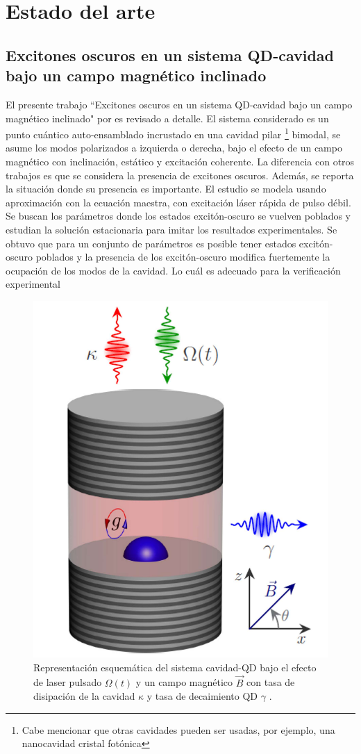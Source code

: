 \documentclass[main.tex]{subfiles}
\begin{document}
\chapter{Estado del arte}
\section[Excitones oscuros en un sistema QD-cavidad bajo un campo magnético...]{Excitones oscuros en un sistema QD-cavidad bajo un campo magnético inclinado}
El presente trabajo ``Excitones oscuros en un sistema QD-cavidad bajo un campo magnético inclinado" por \parencite{Jimenez2017} es revisado a detalle. El sistema considerado es un punto cuántico auto-ensamblado incrustado en una cavidad pilar \parencite{Kim2011}\footnote{Cabe mencionar que otras cavidades pueden ser usadas, por ejemplo, una nanocavidad cristal fotónica} bimodal,  se asume los modos polarizados a izquierda o derecha, bajo el efecto de un campo magnético con inclinación, estático y excitación coherente. La diferencia con otros trabajos \parencite{Zhang2014} es que se considera la presencia de excitones oscuros. Además, se reporta la situación donde su presencia es importante. El estudio se modela usando aproximación con la ecuación maestra, con excitación láser rápida de pulso débil. Se buscan los parámetros donde los estados excitón-oscuro se vuelven poblados y estudian la solución estacionaria para imitar los resultados experimentales. Se obtuvo que para un conjunto de parámetros es posible tener estados excitón-oscuro poblados y la presencia de los excitón-oscuro modifica fuertemente la ocupación de los modos de la cavidad. Lo cuál es adecuado para la verificación experimental

\begin{figure}[th]
	\centering
	\includegraphics[width=0.35\linewidth]{img/cavidad-QD}
	\caption{Representación esquemática del sistema cavidad-QD bajo el efecto de laser pulsado $\Omega(t)$ y un campo magnético $\vec{B}$ con tasa de disipación de la cavidad $\kappa$ y tasa de decaimiento QD $\gamma$ \parencite{Jimenez2017}.}
	\label{fig:cavidad-qd}
\end{figure}
\end{document}
